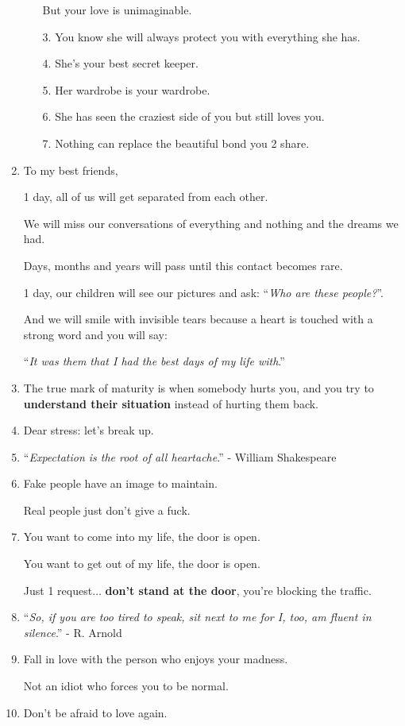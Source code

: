 \documentclass{article}
\begin{document}
\begin{enumerate}
\begin{itemize}
		But your love is unimaginable.
		\item[3.] You know she will always protect you with everything she has.
		\item[4.] She's your best secret keeper.
		\item[5.] Her wardrobe is your wardrobe.
		\item[6.] She has seen the craziest side of you but still loves you.
		\item[7.] Nothing can replace the beautiful bond you 2 share.
	\end{itemize}
	\item To my best friends,
	
	1 day, all of us will get separated from each other.
	
	We will miss our conversations of everything and nothing and the dreams we had.
	
	Days, months and years will pass until this contact becomes rare.
	
	1 day, our children will see our pictures and ask: ``\textit{Who are these people?}''.
	
	And we will smile with invisible tears because a heart is touched with a strong word and you will say:
	
	``\textit{It was them that I had the best days of my life with}.''
	\item The true mark of maturity is when somebody hurts you, and you try to \textbf{understand their situation} instead of hurting them back.
	\item Dear stress: let's break up.
	\item ``\textit{Expectation is the root of all heartache}.'' - William Shakespeare
	\item Fake people have an image to maintain.
	
	Real people just don't give a fuck.
	\item You want to come into my life, the door is open.
	
	You want to get out of my life, the door is open.
	
	Just 1 request$\ldots$ \textbf{don't stand at the door}, you're blocking the traffic.
	\item ``\textit{So, if you are too tired to speak, sit next to me for I, too, am fluent in silence}.'' - R. Arnold
	\item Fall in love with the person who enjoys your madness.
	
	Not an idiot who forces you to be normal.
	\item Don't be afraid to love again.
	

\end{enumerate}
\end{document}
